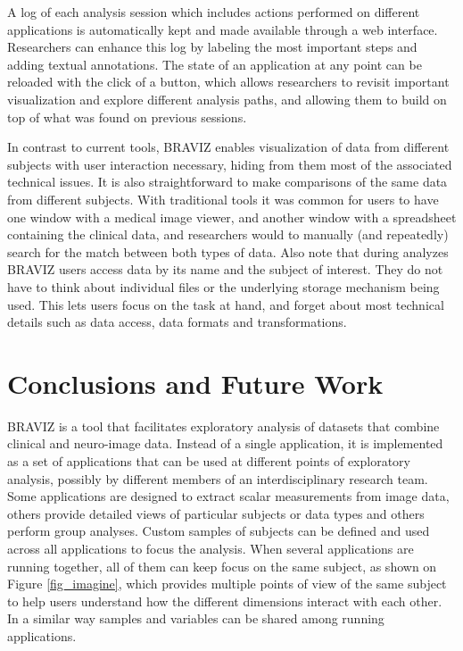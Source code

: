 \documentclass[twocolumn]{svjour3}
\begin{document}
A log of each analysis session which includes actions performed on different applications is automatically kept and made available through a web interface. Researchers can enhance this log by labeling the most important steps and adding textual annotations. The state of an application at any point can be reloaded with the click of a button, which allows researchers to revisit important visualization and explore different analysis paths, and allowing them to build on top of what was found on previous sessions. 

In contrast to current tools, BRAVIZ enables visualization of data from different subjects with user interaction necessary, hiding from them most of the associated technical issues. It is also straightforward to make comparisons of the same data from different subjects. With traditional tools it was common for users to have one window with a medical image viewer, and another window with a spreadsheet containing the clinical data, and researchers would to manually (and repeatedly) search for the match between both types of data. Also note that during analyzes BRAVIZ users access data by its name and the subject of interest. They do not have to think about individual files or  the underlying storage mechanism being used. This lets users focus on the task at hand, and forget about most technical details such as data access, data formats and transformations. 

\section{Conclusions and Future Work}

BRAVIZ is a tool that facilitates exploratory analysis of datasets that combine clinical and neuro-image data. Instead of a single application, it is implemented as a set of applications that can be used at different points of exploratory analysis, possibly by different members of an interdisciplinary research team. Some applications are designed to extract scalar measurements from image data, others provide detailed views of particular subjects or data types and others perform group analyses. Custom samples of subjects can be defined and used across all applications to focus the analysis. When several applications are running together, all of them can keep focus on the same subject, as shown on Figure \ref{fig_imagine}, which provides multiple points of view of the same subject to help users understand how the different dimensions interact with each other. In a similar way samples and variables can be shared among running applications.
\end{document}
